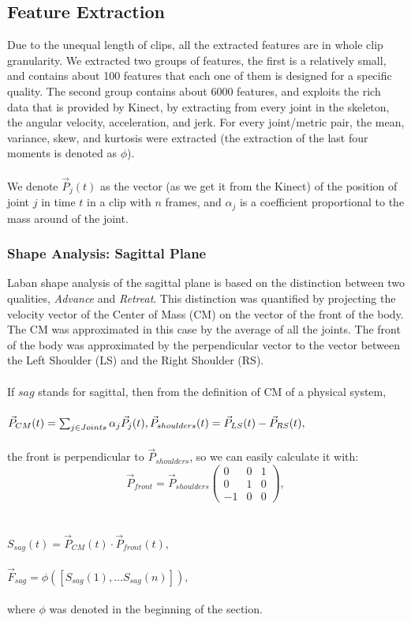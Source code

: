 \documentclass[11pt,twocolumn,varwidth=true,a4paper,fleqn]{article}
\begin{document}
\subsection{Feature Extraction}
Due to the unequal length of clips, all the extracted features are in whole clip 
granularity. We extracted two groups of features, the first is a relatively
small, and contains about 100 features that each one of them is designed for a
specific quality. The second group contains about 6000 features, and exploits the rich data that
is provided by Kinect, by extracting from every joint in the skeleton, the
angular velocity, acceleration, and jerk. For every joint/metric pair, the mean,
variance, skew, and kurtosis were extracted (the extraction of the last four moments is denoted as $\phi$).
\\\\We denote $\vec{P}_{j}(t)$ as the vector (as we get it from the Kinect) of
the position of joint $j$ in time $t$ in a clip with $n$ frames, and
$\alpha_{j}$ is a coefficient proportional to the mass around of the joint.
\subsubsection{Shape Analysis: Sagittal Plane}
Laban shape analysis of the sagittal plane is based on the distinction
between two qualities, \textit{Advance} and \textit{Retreat}. This distinction was quantified by projecting the 
velocity vector of the Center of Mass (CM) on the vector of the front of the
body.
The CM was approximated in this case by the average of all the joints. 
The front of the body was approximated by the perpendicular vector to the vector 
between the Left Shoulder (LS) and
the Right Shoulder (RS).
\\\\If $sag$ stands for sagittal, then from the definition of CM of a physical
system,
\\
\\$\vec{P}_{CM}(t) = \sum_{j \in Joints} \alpha_{j}\vec{P}_{j}(t),
\\
\\\vec{P}_{shoulders}(t)=\vec{P}_{LS}(t)-\vec{P}_{RS}(t),$
\\\\the front is perpendicular to $\vec{P}_{shoulders}$, so we can easily calculate it with:
\\\[\vec{P}_{front}=\vec{P}_{shoulders}\left( \begin{array}{ccc}
0 & 0 & 1 \\
0 & 1 & 0 \\
-1 & 0 & 0 \end{array} \right),\]
\\\\$S_{sag}(t) = \vec{P}_{CM}(t)\cdot\vec{P}_{front}(t),$ 
\\\\$\vec{F}_{sag} = \phi([S_{sag}(1), \ldots S_{sag}(n)]),$
\\\\where $\phi$ was denoted in the beginning of the section.
\end{document}
